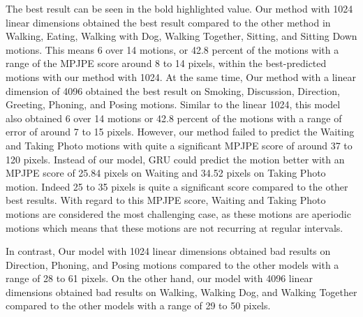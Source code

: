 The best result can be seen in the bold highlighted value. Our method with 1024 linear dimensions obtained the best result compared to the other method in Walking, Eating, Walking with Dog, Walking Together, Sitting, and Sitting Down motions. This means 6 over 14 motions, or 42.8 percent of the motions with a range of the MPJPE score around 8 to 14 pixels, within the best-predicted motions with our method with 1024. At the same time, Our method with a linear dimension of 4096 obtained the best result on Smoking, Discussion, Direction, Greeting, Phoning, and Posing motions. Similar to the linear 1024, this model also obtained 6 over 14 motions or 42.8 percent of the motions with a range of error of around 7 to 15 pixels. However, our method failed to predict the Waiting and Taking Photo motions with quite a significant MPJPE score of around 37 to 120 pixels. Instead of our model, GRU could predict the motion better with an MPJPE score of 25.84 pixels on Waiting and 34.52 pixels on Taking Photo motion. Indeed 25 to 35 pixels is quite a significant score compared to the other best results. With regard to this MPJPE score, Waiting and Taking Photo motions are considered the most challenging case, as these motions are aperiodic motions which means that these motions are not recurring at regular intervals.

In contrast, Our model with 1024 linear dimensions obtained bad results on Direction, Phoning, and Posing motions compared to the other models with a range of 28 to 61 pixels. On the other hand, our model with 4096 linear dimensions obtained bad results on Walking, Walking Dog, and Walking Together compared to the other models with a range of 29 to 50 pixels. 


